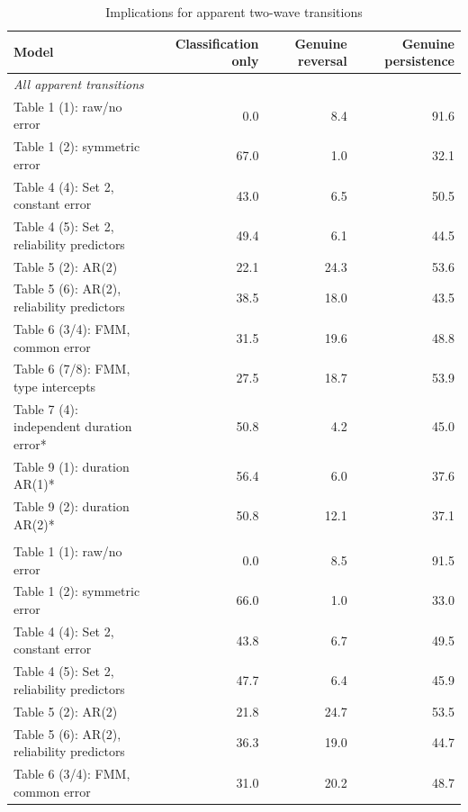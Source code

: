 \setcounter{table}{7}
\begin{table}[H]
\centering
\caption{Implications for apparent two-wave transitions}
\scriptsize
\setlength{\tabcolsep}{7pt}
\begin{tabular}{@{}lrrr@{}}
\toprule
Model & Classification only & Genuine reversal & Genuine persistence \\
\midrule
\multicolumn{4}{l}{\textit{All apparent transitions}} \\
Table 1 (1): raw/no error & 0.0 & 8.4 & 91.6 \\
\addlinespace[1pt]
Table 1 (2): symmetric error & 67.0 & 1.0 & 32.1 \\
\addlinespace[1pt]
Table 4 (4): Set 2, constant error & 43.0 & 6.5 & 50.5 \\
\addlinespace[1pt]
Table 4 (5): Set 2, reliability predictors & 49.4 & 6.1 & 44.5 \\
\addlinespace[1pt]
Table 5 (2): AR(2) & 22.1 & 24.3 & 53.6 \\
\addlinespace[1pt]
Table 5 (6): AR(2), reliability predictors & 38.5 & 18.0 & 43.5 \\
\addlinespace[1pt]
Table 6 (3/4): FMM, common error & 31.5 & 19.6 & 48.8 \\
\addlinespace[1pt]
Table 6 (7/8): FMM, type intercepts & 27.5 & 18.7 & 53.9 \\
\addlinespace[1pt]
Table 7 (4): independent duration error* & 50.8 & 4.2 & 45.0 \\
\addlinespace[1pt]
Table 9 (1): duration AR(1)* & 56.4 & 6.0 & 37.6 \\
\addlinespace[1pt]
Table 9 (2): duration AR(2)* & 50.8 & 12.1 & 37.1 \\
\addlinespace[1pt]
\addlinespace
\multicolumn{4}{l}{\textit{Apparent entries}} \\
Table 1 (1): raw/no error & 0.0 & 8.5 & 91.5 \\
\addlinespace[1pt]
Table 1 (2): symmetric error & 66.0 & 1.0 & 33.0 \\
\addlinespace[1pt]
Table 4 (4): Set 2, constant error & 43.8 & 6.7 & 49.5 \\
\addlinespace[1pt]
Table 4 (5): Set 2, reliability predictors & 47.7 & 6.4 & 45.9 \\
\addlinespace[1pt]
Table 5 (2): AR(2) & 21.8 & 24.7 & 53.5 \\
\addlinespace[1pt]
Table 5 (6): AR(2), reliability predictors & 36.3 & 19.0 & 44.7 \\
\addlinespace[1pt]
Table 6 (3/4): FMM, common error & 31.0 & 20.2 & 48.7 \\

\end{tabular}
\end{table}
